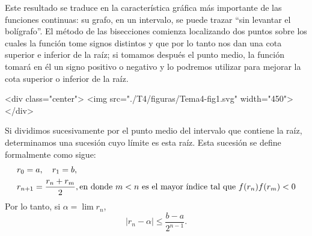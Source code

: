 Este resultado se traduce en la característica gráfica más importante de las funciones continuas: su grafo, en un intervalo, se puede trazar ``sin levantar el bolígrafo''.
El método de las bisecciones comienza localizando dos puntos sobre los cuales la función tome signos distintos y que por lo tanto nos dan una cota superior e inferior de la raíz;
si tomamos después el punto medio, la función tomará en él un signo positivo o negativo y lo podremos utilizar para mejorar la cota superior o inferior de la raíz.
%
\begin{latexonly}
\begin{center}
\end{center}
\end{latexonly}
\begin{rawhtml}
<div class="center">
<img src="./T4/figuras/Tema4-fig1.svg" width="450">
</div>
\end{rawhtml}
%
Si dividimos sucesivamente por el punto medio del intervalo que contiene la raíz, determinamos una sucesión cuyo límite es esta raíz.
Esta sucesión se define formalmente como sigue:
\begin{align*}
& r_0=a,\quad r_1=b,\\
& r_{n+1}=\frac{r_n+r_m}2, \text{en donde $m< n$ es el mayor índice tal que $f(r_n)f(r_m)< 0$}
\end{align*}
%
Por lo tanto, si $\alpha=\lim r_n$,
\[
|r_n-\alpha|\le \dfrac{b-a}{2^{n-1}}.
\]
%
